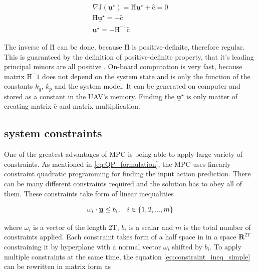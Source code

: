 \documentclass{article}
\begin{document}
\begin{equation}
\label{eq:J_local_min}
\begin{split}
\nabla\mathrm{J}(\underline{\textbf{u}}^{\star}) = \textbf{\^H}\underline{\textbf{u}}^{\star} + \textbf{\^c} = 0 \\
\textbf{\^H}\underline{\textbf{u}}^{\star} = - \textbf{\^c} \\
\underline{\textbf{u}}^{\star} = -\textbf{\^H}^{-1}\textbf{\^c}
\end{split}
\end{equation}

The inverse of $\textbf{\^H}$ can be done, because $\textbf{\^H}$ is positive-definite, therefore regular. This is guaranteed by the definition of positive-definite property, that it's leading principal minors are all positive \cite{chong2013introduction}. On-board computation is very fast, because matrix $\textbf{\^H}^-1$ does not depend on the system state and is only the function of the constants $k_q$, $k_p$ and the system model. It can be generated on computer and stored as a constant in the UAV's memory. Finding the $\underline{\textbf{u}}^{\star}$ is only matter of creating matrix $\textbf{\^c}$ and matrix multiplication.


\subsection{system constraints} \label{ssec:system_constraints}
One of the greatest advantages of MPC is being able to apply large variety of constraints. As mentioned in \ref{eq:QP_formulation}, the MPC uses linearly constraint quadratic programming for finding the input action prediction. There can be many different constraints required and the solution has to obey all of them. These constraints take form of linear inequalities

\begin{equation}
\label{eq:constraint_ineq_simple}
\omega_i \cdot \textbf{\underline{u}} \leq b_i, \;\;\; i \in \{1, 2, ..., m\}
\end{equation}

where $\omega_i$ is a vector of the length 2T, $b_i$ is a scalar and $m$ is the total number of constraints applied. Each constraint takes form of a half space in in a space $\textbf{R}^{2T}$ constraining it by hyperplane with a normal vector $\omega_i$ shifted by $b_i$. To apply multiple constraints at the same time, the equation \ref{eq:constraint_ineq_simple} can be rewritten in matrix form as 
\end{document}
